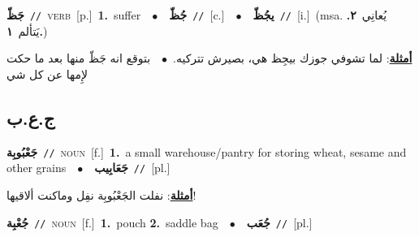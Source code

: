 \documentclass[10pt,a4paper,twoside]{article} %
\begin{document}
\begin{multicols}{2}
{\setlength\topsep{0pt}\textbf{\foreignlanguage{arabic}{جَظّ}}\ {\color{gray}\texttt{//}\color{black}}\ \textsc{verb}\ [p.]\ \textbf{1.}~suffer\ \ $\bullet$\ \ \setlength\topsep{0pt}\textbf{\foreignlanguage{arabic}{جُظّ}}\ {\color{gray}\texttt{//}\color{black}}\ [c.]\ \ $\bullet$\ \ \setlength\topsep{0pt}\textbf{\foreignlanguage{arabic}{يجُظّ}}\ {\color{gray}\texttt{//}\color{black}}\ [i.]\ \color{gray}(msa. \foreignlanguage{arabic}{يُعانِي}~\foreignlanguage{arabic}{\textbf{٢.}}  \foreignlanguage{arabic}{يَتألم}~\foreignlanguage{arabic}{\textbf{١.}})\color{black}\  \begin{flushright}\color{gray}\foreignlanguage{arabic}{\textbf{\underline{\foreignlanguage{arabic}{أمثلة}}}: لما تشوفي جوزك بيجِظ هي، بصيرش تتركيه.\ $\bullet$\ \  بتوقع انه جَظّ منها بعد ما حكت لإِمها عن كل شي}\end{flushright}\color{black}} \vspace{2mm}

\vspace{-3mm}
\subsection*{\color{blue}\foreignlanguage{arabic}{ج.ع.ب}\color{blue}{}} 

{\setlength\topsep{0pt}\textbf{\foreignlanguage{arabic}{جَعْبُوبِة}}\ {\color{gray}\texttt{//}\color{black}}\ \textsc{noun}\ [f.]\ \textbf{1.}~a small warehouse/pantry for storing wheat, sesame and other grains\ \ $\bullet$\ \ \setlength\topsep{0pt}\textbf{\foreignlanguage{arabic}{جَعَابِيب}}\ {\color{gray}\texttt{//}\color{black}}\ [pl.]\  \begin{flushright}\color{gray}\foreignlanguage{arabic}{\textbf{\underline{\foreignlanguage{arabic}{أمثلة}}}: نفلت الجَعْبُوبِة نفِل وماكنت ألاقيها!}\end{flushright}\color{black}} \vspace{2mm}

{\setlength\topsep{0pt}\textbf{\foreignlanguage{arabic}{جُعْبِة}}\ {\color{gray}\texttt{//}\color{black}}\ \textsc{noun}\ [f.]\ \textbf{1.}~pouch  \textbf{2.}~saddle bag\ \ $\bullet$\ \ \setlength\topsep{0pt}\textbf{\foreignlanguage{arabic}{جُعَب}}\ {\color{gray}\texttt{//}\color{black}}\ [pl.]\ } \vspace{2mm}


\end{multicols}
\end{document}
